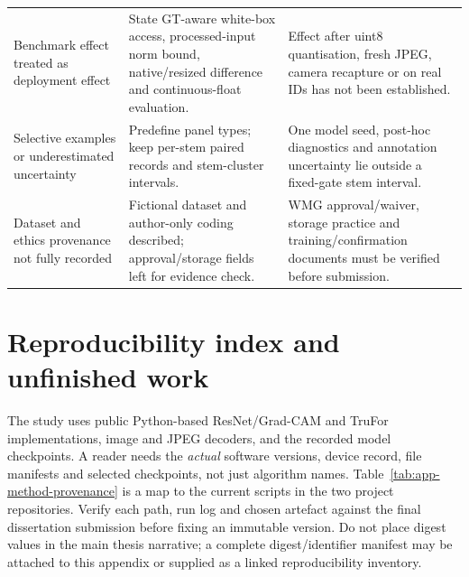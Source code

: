 \begin{table}[H]
\begin{tabularx}{\textwidth}{@{}>{\raggedright\arraybackslash}p{}>{\raggedright\arraybackslash}p{}X@{}}
Benchmark effect treated as deployment effect & State GT-aware white-box access, processed-input norm bound, native/resized difference and continuous-float evaluation. & Effect after uint8 quantisation, fresh JPEG, camera recapture or on real IDs has not been established. \\
Selective examples or underestimated uncertainty & Predefine panel types; keep per-stem paired records and stem-cluster intervals. & One model seed, post-hoc diagnostics and annotation uncertainty lie outside a fixed-gate stem interval. \\
Dataset and ethics provenance not fully recorded & Fictional dataset and author-only coding described; approval/storage fields left for evidence check. & WMG approval/waiver, storage practice and training/confirmation documents must be verified before submission. \\
\bottomrule
\end{tabularx}
\end{table}

\section{Reproducibility index and unfinished work}
\label{app:method-repro}

The study uses public Python-based ResNet/Grad-CAM and TruFor implementations, image and JPEG decoders, and the recorded model checkpoints. A reader needs the \emph{actual} software versions, device record, file manifests and selected checkpoints, not just algorithm names. Table~\ref{tab:app-method-provenance} is a map to the current scripts in the two project repositories. Verify each path, run log and chosen artefact against the final dissertation submission before fixing an immutable version. Do not place digest values in the main thesis narrative; a complete digest/identifier manifest may be attached to this appendix or supplied as a linked reproducibility inventory.

